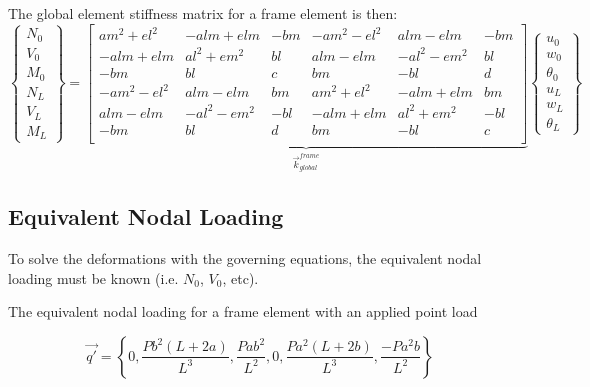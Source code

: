 \newpage



\begin{strip}
The global element stiffness matrix for a frame element is then:
	\begin{equation}
		\begin{Bmatrix}
			N_0\\ V_0\\ M_0\\ \hline N_L\\ V_L\\ M_L
		\end{Bmatrix}
	=
	\underbrace{
		\left[
		\begin{array}{c|cc|c|cc}
			am^2 + el^2&-alm + elm&-bm&-am^2 - el^2&alm - elm&-bm\\ \hline
			-alm + elm&al^2 + em^2&bl&alm - elm&-al^2 - em^2&bl\\
			-bm&bl&c&bm&-bl&d\\ \hline
			-am^2 - el^2&alm - elm&bm&am^2 + el^2&-alm + elm&bm\\ \hline
			alm - elm&-al^2 - em^2&-bl&-alm + elm&al^2 + em^2&-bl\\
			-bm&bl&d&bm&-bl&c\\
		\end{array}
		\right]
		}_{\displaystyle{\vec{k}_{global}^{frame}}}
		\begin{Bmatrix}
			u_0\\ w_0\\ \theta_0\\ \hline u_L\\ w_L\\ \theta_L
		\end{Bmatrix}
	\end{equation}
\end{strip}


\subsection{Equivalent Nodal Loading}
To solve the deformations with the governing equations, the equivalent nodal loading must be known (i.e. $N_0$, $V_0$, etc). 

The equivalent nodal loading for a frame element with an applied point load

\begin{equation}
	\vec{q'} = \left\{ 
	0,
	\frac{Pb^2(L+2a)}{L^3},
	\frac{Pab^2}{L^2},
	0,
	\frac{Pa^2(L+2b)}{L^3},
	\frac{-Pa^2b}{L^2}
	\right\}
\end{equation}

